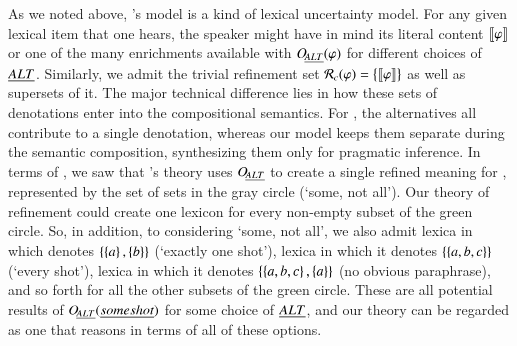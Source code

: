 \documentclass[leqno,12pt]{article}
\begin{document}
As we noted above, \CFS's model is a kind of lexical uncertainty
model. For any given lexical item that one hears, the speaker might
have in mind its literal content $\llbracket\varphi\rrbracket$ or one of the many
enrichments available with $\mathop{O\negthinspace_{\emph{ALT}}}(\varphi)$ for different choices of
$\emph{ALT}$. Similarly, we admit the trivial refinement set
$\mathcal{R}_{c}(\varphi) = \left\{ \llbracket\varphi\rrbracket \right\}$ as well as supersets of
it. The major technical difference lies in how these sets of
denotations enter into the compositional semantics. For \CFS, the
alternatives all contribute to a single denotation, whereas our model
keeps them separate during the semantic composition, synthesizing them
only for pragmatic inference. In terms of , we saw
that \CFS's theory uses $\mathop{O\negthinspace_{\emph{ALT}}}$ to create a single refined meaning for
, represented by the set of sets in the gray circle
(`some, not all'). Our theory of refinement could create one lexicon
for every non-empty subset of the green circle. So, in addition, to
considering `some, not all', we also admit lexica in which  denotes $\left\{ \left\{ a \right\}, \left\{ b \right\} \right\}$ (`exactly one shot'),
lexica in which it denotes $\left\{ \left\{ a,b,c \right\} \right\}$ (`every shot'), lexica
in which it denotes $\left\{ \left\{ a,b,c \right\},\left\{ a \right\} \right\}$ (no obvious
paraphrase), and so forth for all the other subsets of the green
circle. These are all potential results of $\mathop{O\negthinspace_{\emph{ALT}}}(\emph{some shot})$
for some choice of $\emph{ALT}$, and our theory can be regarded as one that
reasons in terms of all of these options.
\end{document}
